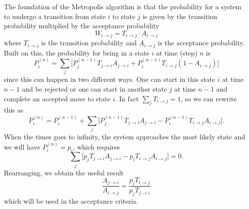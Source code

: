 \documentclass[norsk,a4paper,12pt]{article}
\begin{document}
The foundation of the Metropolis algorithm is that the probability for a system to undergo a transition from state $i$ to state $j$ is given by the transition probability multiplied by the acceptance probability
\begin{equation}
W_{i\rightarrow j} = T_{i \rightarrow j}\cdot A_{i \rightarrow j}
\end{equation}
where $T_{i \rightarrow j}$ is the transition probability and $A_{i \rightarrow j}$ is the acceptance probability. Built on this, the probability for being in a state $i$ at time (step) $n$ is
\begin{equation}
P_i^{(n)} = \sum_j\bigg[P_j^{(n-1)}T_{j \rightarrow i}A_{j \rightarrow i} + P_i^{(n-1)}T_{i \rightarrow j}(1-A_{i \rightarrow j})\bigg]
\end{equation}
since this can happen in two different ways. One can start in this state $i$ at time $n-1$ and be rejected or one can start in another state $j$ at time $n-1$ and complete an accepted move to state $i$. In fact $\sum_j T_{i \rightarrow j} =1$, so we can rewrite this as 
\begin{equation}
P_i^{(n)} = P_i^{(n-1)} + \sum_j\bigg[P_j^{(n-1)}T_{j \rightarrow i}A_{j \rightarrow i} - P_i^{(n-1)}T_{i \rightarrow j}A_{i \rightarrow j}\bigg].
\end{equation}
When the times goes to infinity, the system approaches the most likely state and we will have $P_i^{(n)} = p_i$, which requires
\begin{equation}
\sum_j\bigg[p_jT_{j \rightarrow i}A_{j \rightarrow i} - p_iT_{i \rightarrow j}A_{i \rightarrow j}\bigg]=0.
\end{equation}
Rearranging, we obtain the useful result
\begin{equation}
\frac{A_{j\rightarrow i}}{A_{i\rightarrow j}}=\frac{p_iT_{i\rightarrow j}}{p_jT_{j\rightarrow i}}
\end{equation}
which will be used in the acceptance criteria.
\end{document}
